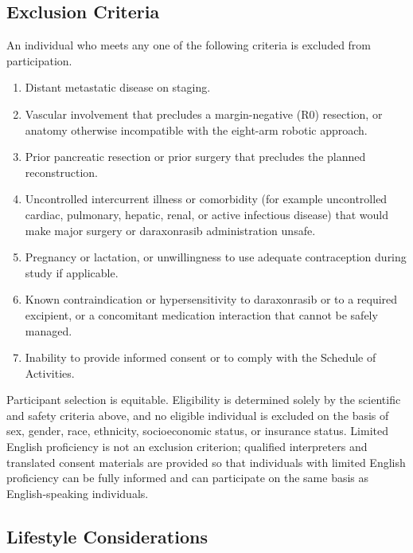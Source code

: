 \subsection{Exclusion Criteria}

An individual who meets any one of the following criteria is excluded from
participation.

\begin{enumerate}[leftmargin=1.6em,itemsep=2pt,topsep=2pt]
\item Distant metastatic disease on staging.
\item Vascular involvement that precludes a margin-negative (R0) resection, or
anatomy otherwise incompatible with the eight-arm robotic approach.
\item Prior pancreatic resection or prior surgery that precludes the planned
reconstruction.
\item Uncontrolled intercurrent illness or comorbidity (for example uncontrolled
cardiac, pulmonary, hepatic, renal, or active infectious disease) that would make
major surgery or daraxonrasib administration unsafe.
\item Pregnancy or lactation, or unwillingness to use adequate contraception
during study if applicable.
\item Known contraindication or hypersensitivity to daraxonrasib or to a required
excipient, or a concomitant medication interaction that cannot be safely managed.
\item Inability to provide informed consent or to comply with the Schedule of
Activities.
\end{enumerate}

Participant selection is equitable. Eligibility is determined solely by the
scientific and safety criteria above, and no eligible individual is excluded on
the basis of sex, gender, race, ethnicity, socioeconomic status, or insurance
status. Limited English proficiency is not an exclusion criterion; qualified
interpreters and translated consent materials are provided so that individuals
with limited English proficiency can be fully informed and can participate on the
same basis as English-speaking individuals.

\subsection{Lifestyle Considerations}

